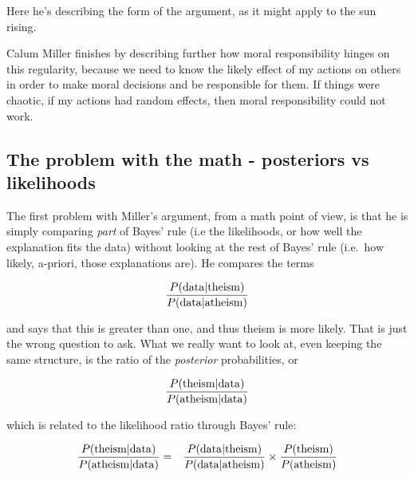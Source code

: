 \documentclass{tufte-book}
\begin{document}
Here he's describing the form of the argument, as it might apply to the
sun rising.


Calum Miller finishes by describing further how moral responsibility
hinges on this regularity, because we need to know the likely effect of
my actions on others in order to make moral decisions and be responsible
for them. If things were chaotic, if my actions had random effects, then
moral responsibility could not work.

\subsection{The problem with the math - posteriors vs
likelihoods}\label{the-problem-with-the-math---posteriors-vs-likelihoods}

The first problem with Miller's argument, from a math point of view, is
that he is simply comparing \emph{part} of Bayes' rule (i.e the
likelihoods, or how well the explanation fits the data) without looking
at the rest of Bayes' rule (i.e.~how likely, a-priori, those
explanations are). He compares the terms

\begin{eqnarray*}
\frac{P({\rm data}|{\rm theism})}{P({\rm data}|{\rm atheism})}
\end{eqnarray*}

and says that this is greater than one, and thus theism is more likely.
That is just the wrong question to ask. What we really want to look at,
even keeping the same structure, is the ratio of the \emph{posterior}
probabilities, or

\begin{eqnarray*}
\frac{P({\rm theism}|{\rm data})}{P({\rm atheism}|{\rm data})}
\end{eqnarray*}

which is related to the likelihood ratio through Bayes' rule:

\begin{eqnarray*}
\frac{P({\rm theism}|{\rm data})}{P({\rm atheism}|{\rm data})} &=& \frac{P({\rm data}|{\rm theism})}{P({\rm data}|{\rm atheism})} \times \frac{P({\rm theism})}{P({\rm atheism})}
\end{eqnarray*}
\end{document}
